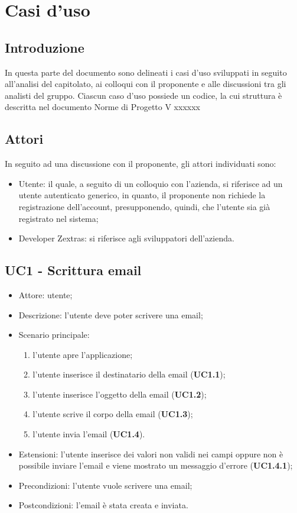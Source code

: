 \section{Casi d'uso}
    \subsection{Introduzione}
    In questa parte del documento sono delineati i casi d'uso sviluppati in seguito all'analisi del capitolato, ai colloqui con il proponente e alle discussioni tra gli analisti del gruppo.
    Ciascun caso d’uso possiede un codice, la cui struttura è descritta nel documento Norme di Progetto V xxxxxx
    \subsection{Attori}
    In seguito ad una discussione con il proponente, gli attori individuati sono:
    \begin{itemize}
        \item Utente: il quale, a seguito di un colloquio con l'azienda, si riferisce ad un utente autenticato generico, in quanto, il proponente
        non richiede la registrazione dell'account, presupponendo, quindi, che l'utente sia già registrato nel sistema;
        \item Developer Zextras: si riferisce agli sviluppatori dell'azienda.
    \end{itemize}

    \subsection{UC1 - Scrittura email}
    \begin{itemize}
        \item Attore: utente;
        \item Descrizione: l'utente deve poter scrivere una email;
        \item Scenario principale:
            \begin{enumerate}
            \item l’utente apre l’applicazione;
            \item l'utente inserisce il destinatario della email (\textbf{UC1.1});
            \item l'utente inserisce l'oggetto della email (\textbf{UC1.2});
            \item l’utente scrive il corpo della email (\textbf{UC1.3});
            \item l’utente invia l'email (\textbf{UC1.4}).
            \end{enumerate}
        \item Estensioni: l'utente inserisce dei valori non validi nei campi oppure non è possibile inviare l'email e viene mostrato un messaggio d'errore (\textbf{UC1.4.1});
        \item Precondizioni: l'utente vuole scrivere una email;
        \item Postcondizioni: l'email è stata creata e inviata.
    \end{itemize}

